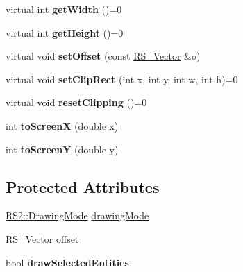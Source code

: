 \begin{DoxyCompactItemize}
\item 
\hypertarget{classRS__Painter_af46058850467b4863f5f23c6de757a6e}{virtual int {\bfseries get\-Width} ()=0}\label{classRS__Painter_af46058850467b4863f5f23c6de757a6e}

\item 
\hypertarget{classRS__Painter_a9c973de560f5a4ec4d8b539d3695f81b}{virtual int {\bfseries get\-Height} ()=0}\label{classRS__Painter_a9c973de560f5a4ec4d8b539d3695f81b}

\item 
\hypertarget{classRS__Painter_a979d6d3d99081903b09e1b9a6b5b2d18}{virtual void {\bfseries set\-Offset} (const \hyperlink{classRS__Vector}{R\-S\-\_\-\-Vector} \&o)}\label{classRS__Painter_a979d6d3d99081903b09e1b9a6b5b2d18}

\item 
\hypertarget{classRS__Painter_afa4a1d26339a73aba018f24f2a6e1eb8}{virtual void {\bfseries set\-Clip\-Rect} (int x, int y, int w, int h)=0}\label{classRS__Painter_afa4a1d26339a73aba018f24f2a6e1eb8}

\item 
\hypertarget{classRS__Painter_a7c44f85b8d9664e5b4121cfb285d8492}{virtual void {\bfseries reset\-Clipping} ()=0}\label{classRS__Painter_a7c44f85b8d9664e5b4121cfb285d8492}

\item 
\hypertarget{classRS__Painter_af2c25fc5d08ed038223f997801ce6899}{int {\bfseries to\-Screen\-X} (double x)}\label{classRS__Painter_af2c25fc5d08ed038223f997801ce6899}

\item 
\hypertarget{classRS__Painter_a0a6446acea7526b62cbf64230b8a3a11}{int {\bfseries to\-Screen\-Y} (double y)}\label{classRS__Painter_a0a6446acea7526b62cbf64230b8a3a11}

\end{DoxyCompactItemize}
\subsection*{Protected Attributes}
\begin{DoxyCompactItemize}
\item 
\hyperlink{classRS2_a67196f135592d0f8eff894bd126685b2}{R\-S2\-::\-Drawing\-Mode} \hyperlink{classRS__Painter_a8576780585347b0682daffb1b8cf8b1c}{drawing\-Mode}
\item 
\hyperlink{classRS__Vector}{R\-S\-\_\-\-Vector} \hyperlink{classRS__Painter_a5d6c68b2780795e155e846cef39cd42b}{offset}
\item 
\hypertarget{classRS__Painter_aa412cfd1f85bd07bb4b4e82018f06142}{bool {\bfseries draw\-Selected\-Entities}}\label{classRS__Painter_aa412cfd1f85bd07bb4b4e82018f06142}

\end{DoxyCompactItemize}


